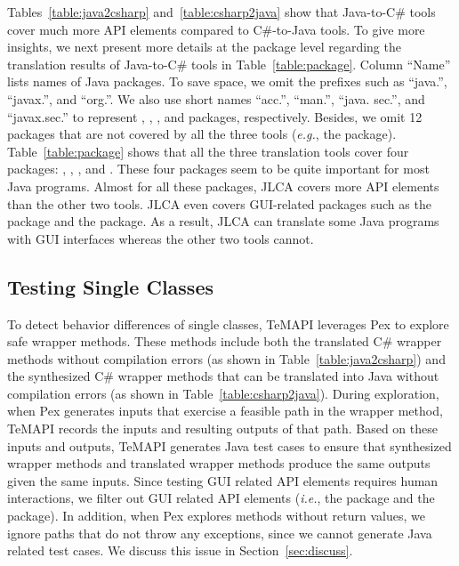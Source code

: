Tables~\ref{table:java2csharp} and~\ref{table:csharp2java} show that Java-to-C\# tools cover much more API elements compared to C\#-to-Java tools. To give more insights, we next present more details at the package level regarding the translation results of Java-to-C\# tools in Table~\ref{table:package}. Column ``Name'' lists names of Java packages. To save space, we omit the prefixes such as ``java.'', ``javax.'', and ``org.''. We also use short names ``acc.'', ``man.'', ``java. sec.'', and ``javax.sec.'' to represent , , , and  packages, respectively. Besides, we omit 12 packages that are not covered by all the three tools (\emph{e.g.}, the  package). Table~\ref{table:package} shows that all the three translation tools cover four packages: , , , and . These four packages seem to be quite important for most Java programs. Almost for all these packages, JLCA covers more API elements than the other two tools. JLCA even covers GUI-related packages such as the  package and the  package. As a result, JLCA can translate some Java programs with GUI interfaces whereas the other two tools cannot.

\subsection{Testing Single Classes}
\label{sec:evaluation:single}

To detect behavior differences of single classes, TeMAPI leverages Pex to explore safe wrapper methods. These methods include both the translated C\# wrapper methods without compilation errors (as shown in Table~\ref{table:java2csharp}) and the synthesized C\# wrapper methods that can be translated into Java without compilation errors (as shown in Table~\ref{table:csharp2java}). During exploration, when Pex generates inputs that exercise a feasible path in the wrapper method, TeMAPI records the inputs and resulting outputs of that path. Based on these inputs and outputs, TeMAPI generates Java test cases to ensure that synthesized wrapper methods and translated wrapper methods produce the same outputs given the same inputs. Since testing GUI related API elements requires human interactions, we filter out GUI related API elements (\emph{i.e.}, the  package and the  package). In addition, when Pex explores methods without return values, we ignore paths that do not throw any exceptions, since we cannot generate Java related test cases. We discuss this issue in Section~\ref{sec:discuss}.

